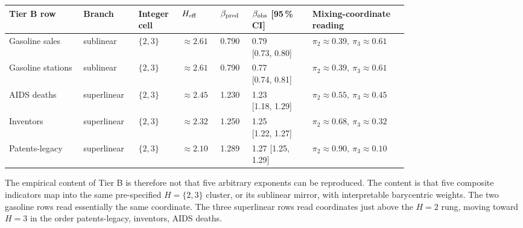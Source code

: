 \begin{center}
\small
\begin{tabular}{p{0.16\linewidth}p{0.09\linewidth}p{0.07\linewidth}p{0.06\linewidth}p{0.06\linewidth}p{0.13\linewidth}p{0.20\linewidth}}
\hline
Tier B row & Branch & Integer cell & \(H_{\rm eff}\) & \(\beta_{\rm pred}\) & \(\beta_{\rm obs}\) [95\,\% CI] & Mixing-coordinate reading \\
\hline
Gasoline sales & sublinear & \(\{2,3\}\) & \(\approx 2.61\) & 0.790 & \makecell[ct]{0.79 \\ {[0.73, 0.80]}} &
\(\pi_2\approx 0.39,\ \pi_3\approx 0.61\) \\
Gasoline stations & sublinear & \(\{2,3\}\) & \(\approx 2.61\) & 0.790 & \makecell[ct]{0.77 \\ {[0.74, 0.81]}} &
\(\pi_2\approx 0.39,\ \pi_3\approx 0.61\) \\
AIDS deaths & superlinear & \(\{2,3\}\) & \(\approx 2.45\) & 1.230 & \makecell[ct]{1.23 \\ {[1.18, 1.29]}} &
\(\pi_2\approx 0.55,\ \pi_3\approx 0.45\) \\
Inventors & superlinear & \(\{2,3\}\) & \(\approx 2.32\) & 1.250 & \makecell[ct]{1.25 \\ {[1.22, 1.27]}} &
\(\pi_2\approx 0.68,\ \pi_3\approx 0.32\) \\
Patents-legacy & superlinear & \(\{2,3\}\) & \(\approx 2.10\) & 1.289 & 1.27 [1.25, 1.29] &
\(\pi_2\approx 0.90,\ \pi_3\approx 0.10\) \\
\hline
\end{tabular}
\end{center}

The empirical content of Tier B is therefore not that five arbitrary exponents can be reproduced. The content is that five composite indicators map into the same pre-specified \(H=\{2,3\}\) cluster, or its sublinear mirror, with interpretable barycentric weights. The two gasoline rows read essentially the same coordinate. The three superlinear rows read coordinates just above the \(H=2\) rung, moving toward \(H=3\) in the order patents-legacy, inventors, AIDS deaths.

